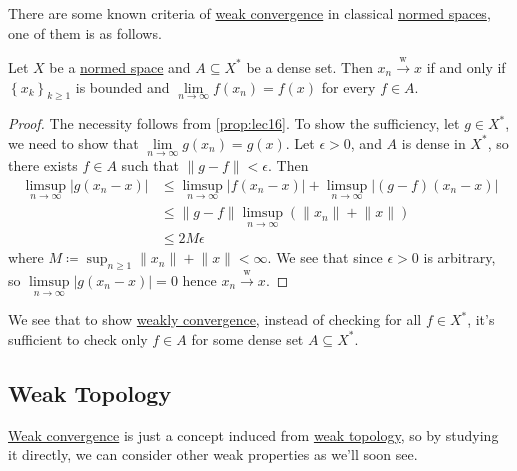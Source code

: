 There are some known criteria of \hyperref[def:weakly-convergence]{weak convergence} in classical \hyperref[def:normed-vector-space]{normed spaces}, one of them is as follows.
\begin{lemma}\label{lma:testing-weak-convergence-on-a-dense-set}
	Let \(X\) be a \hyperref[def:normed-vector-space]{normed space} and \(A \subseteq X^{\ast} \) be a dense set. Then \(x_n \overset{\text{w}}{\to } x\) if and only if \(\left\{ x_k \right\} _{k\geq 1}\) is bounded and \(\lim\limits_{n \to \infty} f(x_n) = f(x)\) for every \(f\in A\).
\end{lemma}
\begin{proof}
	The necessity follows from \autoref{prop:lec16}. To show the sufficiency, let \(g\in X^{\ast} \), we need to show that \(\lim\limits_{n \to \infty} g(x_n) = g(x)\). Let \(\epsilon > 0\), and \(A\) is dense in \(X^{\ast} \), so there exists \(f\in A\) such that \(\left\lVert g-f\right\rVert < \epsilon \). Then
	\[
		\begin{split}
			\limsup_{n \to \infty} \left\vert g(x_n - x) \right\vert
			&\leq \limsup_{n \to \infty} \left\vert f(x_n - x) \right\vert + \limsup_{n \to \infty} \left\vert (g-f)(x_{n} -x ) \right\vert \\
			&\leq \left\lVert g-f\right\rVert \limsup_{n \to \infty} (\lVert x_n  \rVert + \lVert x \rVert) \\
			&\leq 2M\epsilon
		\end{split}
	\]
	where \(M\coloneqq \sup _{n\geq 1} \lVert x_n\rVert + \lVert x \rVert < \infty\). We see that since \(\epsilon > 0\) is arbitrary, so \(\limsup\limits_{n \to \infty} \left\vert g(x_{n} - x ) \right\vert = 0\) hence \(x_n \overset{\text{w}}{\to} x\).
\end{proof}

\begin{note}
	We see that to show \hyperref[def:weakly-convergence]{weakly convergence}, instead of checking for all \(f\in X^{\ast} \), it's sufficient to check only \(f\in A\) for some dense set \(A\subseteq X^{\ast} \).
\end{note}

\subsection{Weak Topology}
\hyperref[def:weakly-convergence]{Weak convergence} is just a concept induced from \hyperref[def:weak-topology]{weak topology}, so by studying it directly, we can consider other weak properties as we'll soon see.

